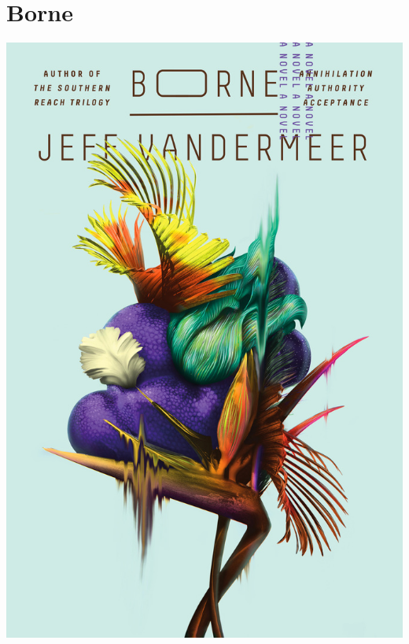 \documentclass{tufte-handout}
\makeatletter
\newcommand{\varcaption}[2][0pt]{%
  \gsetlength{\@tufte@caption@vertical@offset}{-#1}%
  \gdef\@tufte@stored@varcaption{#2}%
}
\gdef\@tufte@stored@varcaption{} %
\makeatother
\begin{document}
\section*{Borne}
\begin{marginfigure}[5\baselineskip]
   \includegraphics[width=\linewidth]{images/borne.jpg}
   \varcaption{\href{https://us.macmillan.com/books/9780374115241}{Publisher Link}, \href{https://www.amazon.com/Borne-Novel-Jeff-VanderMeer/dp/0374537658/}{Amazon Link}}
\end{marginfigure}
\end{document}

